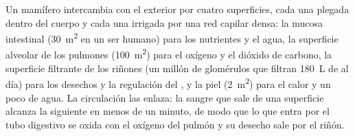 \begin{proposition}\label{prop:b1:mammal-organization:surfaces}
Un mamífero intercambia con el exterior por cuatro superficies, cada una
plegada dentro del cuerpo y cada una irrigada por una red capilar densa: la
mucosa intestinal (\qty{30}{m^2} en un ser humano) para los nutrientes y el
agua, la superficie alveolar de los pulmones (\qty{100}{m^2}) para el
oxígeno y el dióxido de carbono, la superficie filtrante de los riñones (un
millón de glomérulos que filtran \qty{180}{L} de  al día) para los
desechos y la regulación del , y la piel (\qty{2}{m^2}) para el
calor y un poco de agua. La circulación las enlaza: la sangre que sale de
una superficie alcanza la siguiente en menos de un minuto, de modo que lo
que entra por el tubo digestivo se oxida con el oxígeno del pulmón y su
desecho sale por el riñón.
\end{proposition}

